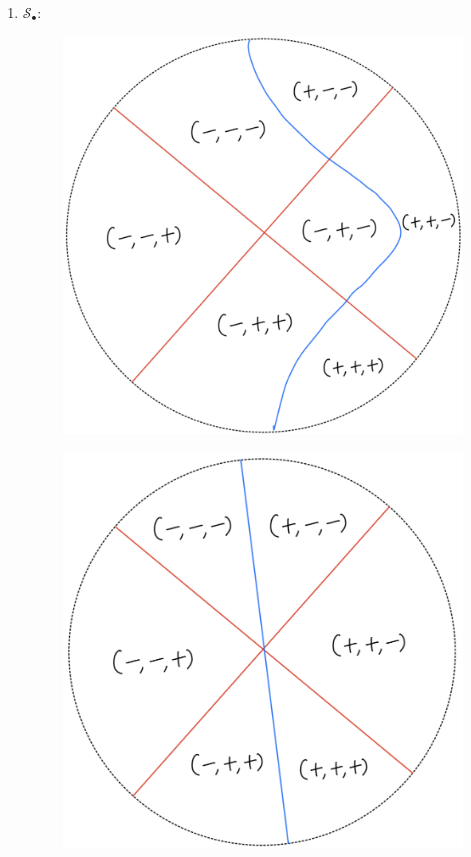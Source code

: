 \begin{definition}
\begin{enumerate}
\item $\mathcal{S}_\bullet$:
\begin{itemize}
\begin{figure}[H]
    \centering
    \includegraphics[scale = 0.45]{diagrams/lemma4/7.png}
    \caption{}
    \label{fig:your-label}
\end{figure}
\begin{figure}[H]
    \centering
    \includegraphics[scale = 0.45]{diagrams/lemma4/8.png}

\end{figure}
\end{itemize}
\end{enumerate}
\end{definition}
